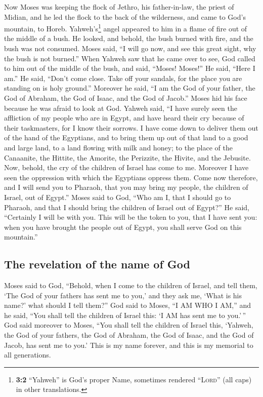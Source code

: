  Now Moses was keeping the flock of Jethro, his
father-in-law, the priest of Midian, and he led the flock to the back of
the wilderness, and came to God's mountain, to Horeb. 
Yahweh's\footnote{\textbf{3:2} ``Yahweh'' is God's proper Name,
  sometimes rendered ``\textsc{Lord}'' (all caps) in other translations.}
angel appeared to him in a flame of fire out of the middle of a bush. He
looked, and behold, the bush burned with fire, and the bush was not
consumed.  Moses said, ``I will go now, and see this great
sight, why the bush is not burned.''  When Yahweh saw that
he came over to see, God called to him out of the middle of the bush,
and said, ``Moses! Moses!'' He said, ``Here I am.''  He
said, ``Don't come close. Take off your sandals, for the place you are
standing on is holy ground.''  Moreover he said, ``I am
the God of your father, the God of Abraham, the God of Isaac, and the
God of Jacob.'' Moses hid his face because he was afraid to look at God.
 Yahweh said, ``I have surely seen the affliction of my
people who are in Egypt, and have heard their cry because of their
taskmasters, for I know their sorrows.  I have come down
to deliver them out of the hand of the Egyptians, and to bring them up
out of that land to a good and large land, to a land flowing with milk
and honey; to the place of the Canaanite, the Hittite, the Amorite, the
Perizzite, the Hivite, and the Jebusite.  Now, behold, the
cry of the children of Israel has come to me. Moreover I have seen the
oppression with which the Egyptians oppress them.  Come
now therefore, and I will send you to Pharaoh, that you may bring my
people, the children of Israel, out of Egypt.''  Moses
said to God, ``Who am I, that I should go to Pharaoh, and that I should
bring the children of Israel out of Egypt?''  He said,
``Certainly I will be with you. This will be the token to you, that I
have sent you: when you have brought the people out of Egypt, you shall
serve God on this mountain.''

\hypertarget{the-revelation-of-the-name-of-god}{%
\subsection{The revelation of the name of
God}\label{the-revelation-of-the-name-of-god}}

 Moses said to God, ``Behold, when I come to the children
of Israel, and tell them, `The God of your fathers has sent me to you,'
and they ask me, `What is his name?' what should I tell them?''
 God said to Moses, ``I AM WHO I AM,'' and he said, ``You
shall tell the children of Israel this: `I AM has sent me to you.'\,''
 God said moreover to Moses, ``You shall tell the
children of Israel this, `Yahweh, the God of your fathers, the God of
Abraham, the God of Isaac, and the God of Jacob, has sent me to you.'
This is my name forever, and this is my memorial to all generations.

